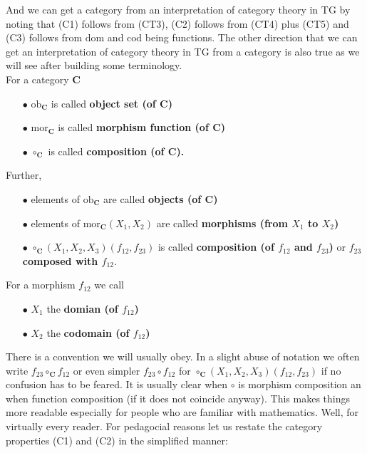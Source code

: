And we can get a category from an interpretation of category theory in TG by noting that (C1) follows from (CT3), (C2) follows from (CT4) plus (CT5) and (C3) follows from $\mathrm{dom}$ and $\mathrm{cod}$ being functions. The other direction that we can get an interpretation of category theory in TG from a category is also true as we will see after building some terminology.
\\
For a category $\mathbf{C}$
\begin{enumerate}
\item[$\bullet$]
$\mathrm{ob}_{\mathbf{C}}$ is called \textbf{object set (of $\mathbf{C}$)}
\item[$\bullet$]
$\mathrm{mor}_{\mathbf{C}}$ is called \textbf{morphism function (of $\mathbf{C}$)}
\item[$\bullet$]
$\circ_{\mathbf{C}}$ is called \textbf{composition (of $\mathbf{C}$).}
\end{enumerate}
Further,
\begin{enumerate}
\item[$\bullet$]
elements of $\mathrm{ob}_{\mathbf{C}}$ are called \textbf{objects (of $\mathbf{C}$)}
\item[$\bullet$]
elements of $\mathrm{mor}_{\mathbf{C}}(X_{1},X_{2})$ are called \textbf{morphisms (from $X_{1}$ to $X_{2}$)}
\item[$\bullet$]
$\circ_{\mathbf{C}}(X_{1},X_{2},X_{3})(f_{12},f_{23})$ is called \textbf{composition (of $f_{12}$ and $f_{23}$)} or \textbf{$f_{23}$ composed with $f_{12}$}.
\end{enumerate}
For a morphism $f_{12}$ we call
\begin{enumerate}
\item[$\bullet$]
$X_{1}$ the \textbf{domian (of $f_{12}$)}
\item[$\bullet$]
$X_{2}$ the \textbf{codomain (of $f_{12}$)}
\end{enumerate}
There is a convention we will usually obey. In a slight abuse of notation we often write $f_{23} \circ_{\mathbf{C}} f_{12}$ or even simpler $f_{23} \circ f_{12}$ for $\circ_{\mathbf{C}}(X_{1},X_{2},X_{3})(f_{12},f_{23})$ if no confusion has to be feared. It is usually clear when $\circ$ is morphism composition an when function composition (if it does not coincide anyway). This makes things more readable especially for people who are familiar with mathematics. Well, for virtually every reader. For pedagocial reasons let us restate the category properties (C1) and (C2) in the simplified manner:
